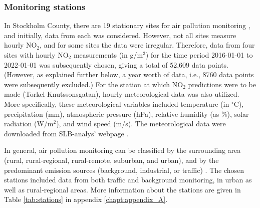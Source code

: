 \subsubsection{Monitoring stations}
In Stockholm County, there are 19 stationary sites for air pollution monitoring \cite{slb-matningar}, and initially, data from each was considered. However, not all sites measure hourly NO$_2$, and for some sites the data were irregular. Therefore, data from four sites with hourly NO$_2$ measurements (in \textmugreek g/m$^3$) for the time period 2016-01-01 to 2022-01-01 was subsequently chosen, giving a total of 52,609 data points. (However, as explained further below, a year worth of data, i.e., 8760 data points were subsequently excluded.) For the station at which NO$_2$ predictions were to be made (Torkel Knutssonsgatan), hourly meteorological data was also utilized. More specifically, these meteorological variables included temperature (in $^\circ$C), precipitation (mm), atmospheric pressure (hPa), relative humidity (as \%), solar radiation (W/m$^2$), and wind speed (m/s). The meteorological data were downloaded from SLB-analys' webpage \cite{slb-analys-meteorologi}. 

In general, air pollution monitoring can be classified by the surrounding area (rural, rural-regional, rural-remote, suburban, and urban), and by the predominant emission sources (background, industrial, or traffic) \cite{smhi-luftmatningar}. The chosen stations included data from both traffic and background monitoring, in urban as well as rural-regional areas. More information about the stations are given in Table \ref{tab:stations} in appendix \ref{chapt:appendix_A}. 

